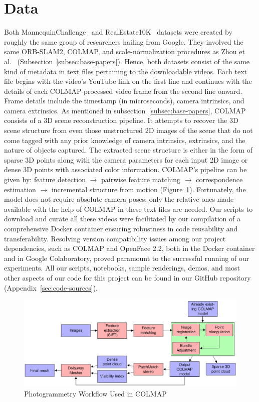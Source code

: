 \section{Data}\label{sec:data} 

Both MannequinChallenge~\cite{li2019learning} and RealEstate10K~\cite{zhou2018stereo} datasets were created by roughly the same group of researchers hailing from Google. They involved the same ORB-SLAM2, COLMAP, and scale-normalization procedures as Zhou et al.~\cite{zhou2018stereo} (Subsection~\ref{subsec:base-papers}). Hence, both datasets consist of the same kind of metadata in text files pertaining to the downloadable videos. Each text file begins with the video’s YouTube link on the first line and continues with the details of each COLMAP-processed video frame from the second line onward. Frame details include the timestamp (in microseconds), camera intrinsics, and camera extrinsics. As mentioned in subsection~\ref{subsec:base-papers}, COLMAP consists of a 3D scene reconstruction pipeline. It attempts to recover the 3D scene structure from even those unstructured 2D images of the scene that do not come tagged with any prior knowledge of camera intrinsics, extrinsics, and the nature of objects captured. The extracted scene structure is either in the form of sparse 3D points along with the camera parameters for each input 2D image or dense 3D points with associated color information. COLMAP's pipeline can be given by: feature detection $\rightarrow$ pairwise feature matching  $\rightarrow$ correspondence estimation $\rightarrow$ incremental structure from motion (Figure~\ref{fig:colmap-photogrammetry-pipeline}). Fortunately, the model does not require absolute camera poses; only the relative ones made available with the help of COLMAP in these text files are needed. Our scripts to download and curate all these videos were facilitated by our compilation of a comprehensive Docker container ensuring robustness in code reusability and transferability. Resolving version compatibility issues among our project dependencies, such as COLMAP and OpenFace 2.2, both in the Docker container and in Google Colaboratory, proved paramount to the successful running of our experiments. All our scripts, notebooks, sample renderings, demos, and most other aspects of our code for this project can be found in our GitHub repository (Appendix~\ref{sec:code-sources}).

\begin{figure}[!h]
    \includegraphics[width=1\columnwidth]{figures/colmap-photogrammetry-pipeline.png}
    \caption{Photogrammetry Workflow Used in COLMAP~\cite{pinard_does_2021}}
    \label{fig:colmap-photogrammetry-pipeline}
\end{figure}
    
